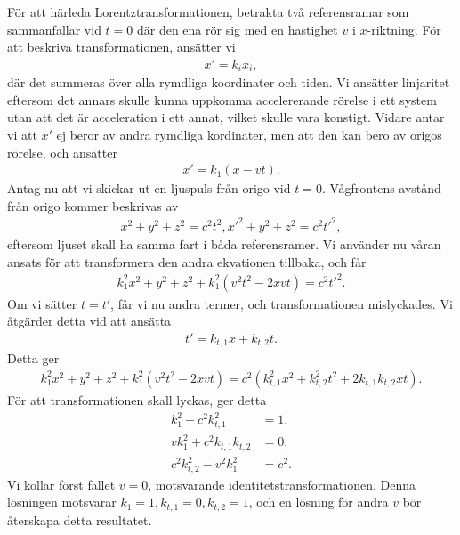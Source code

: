 För att härleda Lorentztransformationen, betrakta två referensramar som sammanfallar vid $t = 0$ där den ena rör sig med en hastighet $v$ i $x$-riktning. För att beskriva transformationen, ansätter vi
\begin{align*}
	x' = k_{i}x_{i},
\end{align*}
där det summeras över alla rymdliga koordinater och tiden. Vi ansätter linjaritet eftersom det annars skulle kunna uppkomma accelererande rörelse i ett system utan att det är acceleration i ett annat, vilket skulle vara konstigt. Vidare antar vi att $x'$ ej beror av andra rymdliga kordinater, men att den kan bero av origos rörelse, och ansätter
\begin{align*}
	x' = k_{1}(x - vt).
\end{align*}
Antag nu att vi skickar ut en ljuspuls från origo vid $t = 0$. Vågfrontens avstånd från origo kommer beskrivas av
\begin{align*}
	x^{2} + y^{2} + z^{2} = c^{2}t^{2},
	x'^{2} + y^{2} + z^{2} = c^{2}t'^{2},
\end{align*}
eftersom ljuset skall ha samma fart i båda referensramer. Vi använder nu våran ansats för att transformera den andra ekvationen tillbaka, och får
\begin{align*}
	k_{1}^{2}x^{2} + y^{2} + z^{2} + k_{1}^{2}(v^{2}t^{2} - 2xvt) = c^{2}t'^{2}.
\end{align*}
Om vi sätter $t = t'$, får vi nu andra termer, och transformationen mislyckades. Vi åtgärder detta vid att ansätta
\begin{align*}
	t' = k_{t, 1}x + k_{t, 2}t.
\end{align*}
Detta ger
\begin{align*}
	k_{1}^{2}x^{2} + y^{2} + z^{2} + k_{1}^{2}(v^{2}t^{2} - 2xvt) = c^{2}(k_{t, 1}^{2}x^{2} + k_{t, 2}^{2}t^{2} + 2k_{t, 1}k_{t, 2}xt).
\end{align*}
För att transformationen skall lyckas, ger detta
\begin{align*}
	k_{1}^{2} - c^{2}k_{t, 1}^{2}      &= 1, \\
	vk_{1}^{2} + c^{2}k_{t, 1}k_{t, 2} &= 0, \\
	c^{2}k_{t, 2}^{2} - v^{2}k_{1}^{2} &= c^{2}.
\end{align*}
Vi kollar först fallet $v = 0$, motsvarande identitetstransformationen. Denna lösningen motsvarar $k_{1} = 1, k_{t, 1} = 0, k_{t, 2} = 1$, och en lösning för andra $v$ bör återskapa detta resultatet.

